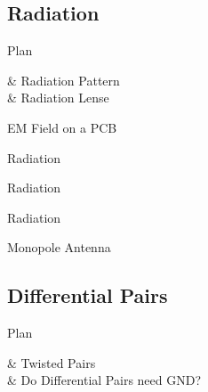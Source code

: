 \subsection[3min-Max]{Radiation }
\maxbackground
\begin{frame}{Plan}
    \begin{makelist}[\small][1.5]
        \icon[red]{\faTimes} & Radiation Pattern\\
        \icon[red]{\faTimes} & Radiation Lense
    \end{makelist}
\end{frame}
\begin{frame}{EM Field on a PCB}
    \vspace{-20pt}
\end{frame}

\begin{frame}{Radiation}
    \vspace{-20pt}
\end{frame}

\begin{frame}{Radiation}
    \vspace{-20pt}
\end{frame}

\begin{frame}{Radiation}
    \vspace{-20pt}
\end{frame}

\begin{frame}{Monopole Antenna}
    \begin{twocolumns}[0.3]
        \leftcol
        \rightcol
    \end{twocolumns}
\end{frame}



\subsection[5min-Pascal]{Differential Pairs}
\pascalbackground
\begin{frame}{Plan}
    \begin{makelist}[\small][1.5]
        \icon[red]{\faTimes} & Twisted Pairs\\
        \icon[red]{\faTimes} & Do Differential Pairs need GND?

    \end{makelist}
\end{frame}
% 
